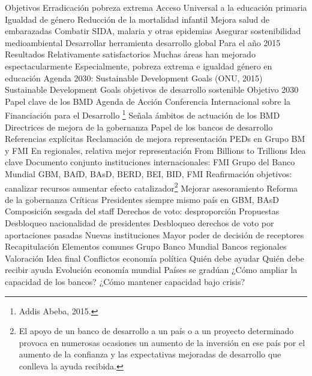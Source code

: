 \documentclass{nuevotema}
\begin{document}
\begin{esquemal}
			\3 Objetivos
				\4 Erradicación pobreza extrema
				\4 Acceso Universal a la educación primaria
				\4 Igualdad de género
				\4 Reducción de la mortalidad infantil
				\4 Mejora salud de embarazadas
				\4 Combatir SIDA, malaria y otras epidemias
				\4 Asegurar sostenibilidad medioambiental
				\4 Desarrollar herramienta desarrollo global
				\4[$\then$] Para el año 2015
			\3 Resultados
				\4 Relativamente satisfactorios
				\4 Muchas áreas han mejorado espectacularmente
				\4 Especialmente, pobreza extrema e igualdad género en educación
		\2 Agenda 2030: Sustainable Development Goals (ONU, 2015)
			\3 Sustainable Development Goals
				 objetivos de desarrollo sostenible
				\4 Objetivo 2030
				\4 Papel clave de los BMD
			\3 Agenda de Acción
				\4 Conferencia Internacional sobre la Financiación para el Desarrollo \footnote{Addis Abeba, 2015.}
				\4 Señala ámbitos de actuación de los BMD
				\4 Directrices de mejora de la gobernanza
			\3 Papel de los bancos de desarrollo
				\4 Referencias explícitas
				\4 Reclamación de mejora representación PEDs en Grupo BM y FMI
				\4 En regionales, relativa mejor representación
		\2 From Billions to Trillions
			\3 Idea clave
				\4 Documento conjunto instituciones internacionales:
				\4[] FMI
				\4[] Grupo del Banco Mundial
				\4 GBM, BAfD, BAsD, BERD, BEI, BID, FMI
				\4 Reafirmación objetivos:
				\4[] canalizar recursos
				\4[] aumentar efecto catalizador\footnote{El apoyo de un banco de desarrollo a un país o a un proyecto determinado provoca en numerosas ocasiones un aumento de la inversión en ese país por el aumento de la confianza y las expectativas mejoradas de desarrollo que conlleva la ayuda recibida.}
				\4[] Mejorar asesoramiento
		\2 Reforma de la gobernanza
			\3 Críticas
				\4 Presidentes siempre mismo país en GBM, BAsD
				\4 Composición sesgada del staff
				\4 Derechos de voto: desproporción
			\3 Propuestas
				\4 Desbloqueo nacionalidad de presidentes
				\4 Desbloqueo derechos de voto por aportaciones pasadas
				\4 Nuevas instituciones
				\4 Mayor poder de decisión de receptores
	\1[] 
		\2 Recapitulación
			\3 Elementos comunes
			\3 Grupo Banco Mundial
			\3 Bancos regionales
			\3 Valoración
		\2 Idea final
			\3 Conflictos economía política
				\4 Quién debe ayudar
				\4 Quién debe recibir ayuda
			\3 Evolución economía mundial
				\4 Países se gradúan
				\4 ¿Cómo ampliar la capacidad de los bancos?
				\4 ¿Cómo mantener capacidad bajo crisis?
\end{esquemal}
\end{document}
